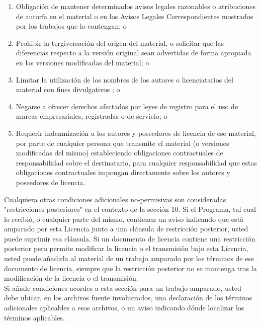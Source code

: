 \begin{enumerate}
\begin{enumerate}
		\item Obligación de mantener determinados avisos legales razonables o atribuciones de autoría en el material o en los Avisos Legales Correspondientes mostrados por los trabajos que lo contengan; o\\
		
		\item Prohibir la tergiversación del origen del material, o solicitar que las diferencias respecto a la versión original sean advertidas de forma apropiada en las versiones modificadas del material; o\\
		
		\item Limitar la utilización de los nombres de los autores o licenciatarios del material con fines divulgativos ; o\\
		
		\item Negarse a ofrecer derechos afectados por leyes de registro para el uso de marcas empresariales, registradas o de servicio; o\\
		
		\item Requerir indemnización a los autores y poseedores de licencia de ese material, por parte de cualquier persona que transmite el material (o versiones modificadas del mismo) estableciendo obligaciones contractuales de responsabilidad sobre el destinatario, para cualquier responsabilidad que estas obligaciones contractuales impongan directamente sobre los autores y poseedores de licencia.\\
		
		\end {enumerate}
		
		Cualquiera otras condiciones adicionales no-permisivas son consideradas "restricciones posteriores" en el contexto de la sección 10. Si el Programa, tal cual lo recibió, o cualquier parte del mismo, contienen un aviso indicando que está amparado por esta Licencia junto a una cláusula de restricción posterior, usted puede suprimir esa cláusula. Si un documento de licencia contiene una restricción posterior pero permite modificar la licencia o el transmisión bajo esta Licencia, usted puede añadirla al material de un trabajo amparado por los términos de ese documento de licencia, siempre que la restricción posterior no se mantenga tras la modificación de la licencia o el transmisión.\\
		
		Si añade condiciones acordes a esta sección para un trabajo amparado, usted debe ubicar, en los archivos fuente involucrados, una declaración de los términos adicionales aplicables a esos archivos, o un aviso indicando dónde localizar los términos aplicables.\\
		

\end{enumerate}
